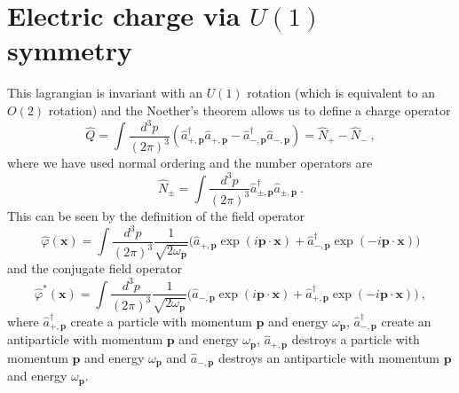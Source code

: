 \section{Electric charge via $U(1)$ symmetry}

    This lagrangian is invariant with an $U(1)$ rotation (which is equivalent to an $O(2)$ rotation) and the Noether's theorem allows us to define a charge operator
    \begin{equation*}
        \hat Q = \int \frac{d^3 p}{(2\pi)^3} (\hat a_{+, \mathbf p}^\dagger \hat a_{+, \mathbf p} - \hat a_{-, \mathbf p}^\dagger \hat a_{-, \mathbf p}) = \hat N_+ - \hat N_- ~,
    \end{equation*}
    where we have used normal ordering and the number operators are 
    \begin{equation*}
        \hat N_\pm = \int \frac{d^3 p}{(2\pi)^3} \hat a_{\pm, \mathbf p}^\dagger \hat a_{\pm, \mathbf p} ~.
    \end{equation*}
    This can be seen by the definition of the field operator 
    \begin{equation}\label{fieldk}
        \hat \varphi (\mathbf x) = \int \frac{d^3 p}{(2\pi)^3} \frac{1}{\sqrt{2 \omega_{\mathbf p}}} \Big ( \hat a_{+, \mathbf p} \exp(i \mathbf p \cdot \mathbf x) + \hat a_{-, \mathbf p}^\dagger \exp(- i \mathbf p \cdot \mathbf x) \Big)
    \end{equation}
    and the conjugate field operator 
    \begin{equation}\label{conj}
        \hat \varphi^* (\mathbf x) = \int \frac{d^3 p}{(2\pi)^3} \frac{1}{\sqrt{2 \omega_{\mathbf p}}} \Big ( \hat a_{-, \mathbf p} \exp(i \mathbf p \cdot \mathbf x) + \hat a_{+, \mathbf p}^\dagger \exp(- i \mathbf p \cdot \mathbf x) \Big) ~,
    \end{equation}
    where $\hat a_{+, \mathbf p}^\dagger$ create a particle with momentum $\mathbf p$ and energy $\omega_{\mathbf p}$, $\hat a_{-, \mathbf p}^\dagger$ create an antiparticle with momentum $\mathbf p$ and energy $\omega_{\mathbf p}$, $\hat a_{+, \mathbf p}$ destroys a particle with momentum $\mathbf p$ and energy $\omega_{\mathbf p}$ and $\hat a_{-, \mathbf p}$ destroys an antiparticle with momentum $\mathbf p$ and energy $\omega_{\mathbf p}$.
